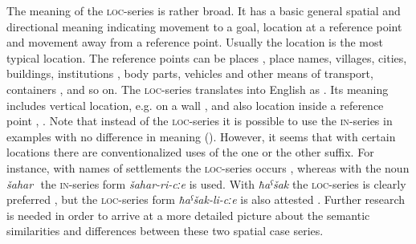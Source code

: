 The meaning of the \textsc{loc}-series is rather broad. It has a basic general spatial and directional meaning indicating movement to a goal, location at a reference point and movement away from a reference point. Usually the location is the most typical location. The reference points can be places , place names, villages, cities, buildings, institutions , body parts, vehicles and other means of transport, containers , and so on. The \textsc{loc-}series translates into English as . Its meaning includes vertical location, e.g. on a wall , and also location inside a reference point , . Note that instead of the \textsc{loc}-series it is possible to use the  \textsc{in}-series in examples  with no difference in meaning (). However, it seems that with certain locations there are conventionalized uses of the one or the other suffix. For instance, with names of settlements the \textsc{loc}-series occurs , whereas with the noun \textit{šahar} ‎‎ the \textsc{in}-series form \textit{šahar-ri-cːe} is used. With \textit{ħaˁšak}  the \textsc{loc}-series is clearly preferred , but the \textsc{loc}-series form \textit{ħaˁšak-li-cːe} is also attested . Further research is needed in order to arrive at a more detailed picture about the semantic similarities and differences between these two spatial case series.

